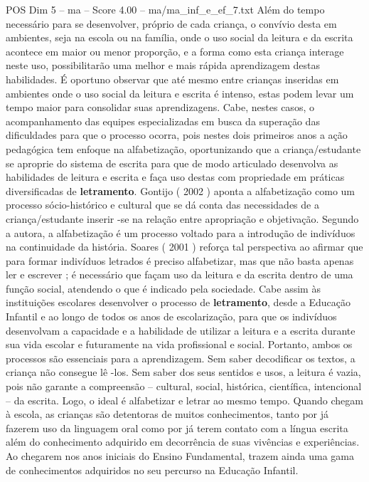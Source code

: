 \begin{textsample}{POS Dim 5 – ma – Score 4.00 – ma/ma\_inf\_e\_ef\_7.txt}
Além do tempo necessário para se desenvolver, próprio de cada criança, o convívio desta em ambientes, seja na escola ou na família, onde o uso social da leitura e da escrita acontece em maior ou menor proporção, e a forma como esta criança interage neste uso, possibilitarão uma melhor e mais rápida aprendizagem destas habilidades.
É oportuno observar que até mesmo entre crianças inseridas em ambientes onde o uso social da leitura e escrita é intenso, estas podem levar um tempo maior para consolidar suas aprendizagens.
Cabe, nestes casos, o acompanhamento das equipes especializadas em busca da superação das dificuldades para que o processo ocorra, pois nestes dois primeiros anos a ação pedagógica tem enfoque na alfabetização, oportunizando que a criança/estudante se aproprie do sistema de escrita para que de modo articulado desenvolva as habilidades de leitura e escrita e faça uso destas com propriedade em práticas diversificadas de \textbf{letramento}.
Gontijo ( 2002 ) aponta a alfabetização como um processo sócio-histórico e cultural que se dá conta das necessidades de a criança/estudante inserir -se na relação entre apropriação e objetivação.
Segundo a autora, a alfabetização é um processo voltado para a introdução de indivíduos na continuidade da história.
Soares ( 2001 ) reforça tal perspectiva ao afirmar que para formar indivíduos letrados é preciso alfabetizar, mas que não basta apenas ler e escrever ; é necessário que façam uso da leitura e da escrita dentro de uma função social, atendendo o que é indicado pela sociedade.
Cabe assim às instituições escolares desenvolver o processo de \textbf{letramento}, desde a Educação Infantil e ao longo de todos os anos de escolarização, para que os indivíduos desenvolvam a capacidade e a habilidade de utilizar a leitura e a escrita durante sua vida escolar e futuramente na vida profissional e social.
Portanto, ambos os processos são essenciais para a aprendizagem.
Sem saber decodificar os textos, a criança não consegue lê -los.
Sem saber dos seus sentidos e usos, a leitura é vazia, pois não garante a compreensão – cultural, social, histórica, científica, intencional – da escrita.
Logo, o ideal é alfabetizar e letrar ao mesmo tempo.
Quando chegam à escola, as crianças são detentoras de muitos conhecimentos, tanto por já fazerem uso da linguagem oral como por já terem contato com a língua escrita além do conhecimento adquirido em decorrência de suas vivências e experiências.
Ao chegarem nos anos iniciais do Ensino Fundamental, trazem ainda uma gama de conhecimentos adquiridos no seu percurso na Educação Infantil.

\end{textsample}
